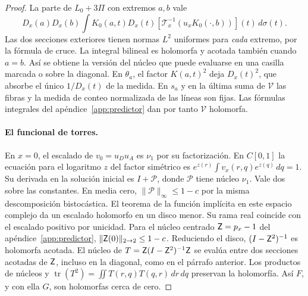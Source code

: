 \begin{proof}
La parte de \(L_0+3\Pi\) con extremos \(a,b\) vale
\[
 D_x(a)D_x(b)\int K_0(a,t)D_x(t)
     [\mathcal T_x^{-1}(u_x K_0(\cdot,b))](t)\,d\sigma(t).
\]
Las dos secciones exteriores tienen normas \(L^2\) uniformes para \emph{cada} extremo,
por la fórmula de cruce. La integral bilineal es holomorfa y acotada también cuando \(a=b\).
Así se obtiene la versión del núcleo que puede evaluarse en una casilla marcada o sobre la
diagonal. En \(\theta_a\), el factor \(K(a,t)^2\) deja \(D_x(t)^2\), que absorbe el único
\(1/D_x(t)\) de la medida. En \(s_a\) y en la última suma de \(\mathcal V\) las fibras y la
medida de conteo normalizada de las líneas son fijas. Las fórmulas integrales del
apéndice~\ref{app:predictor} dan por tanto \(\mathcal V\) holomorfa.

\paragraph{El funcional de torres.}
En \(x=0\), el escalado de \(v_0=u_Du_A\) es \(\nu_1\) por su factorización.
En \(C[0,1]\) la ecuación para el logaritmo \(z\) del factor simétrico es
\(e^{z(r)}\int v_x(r,q)e^{z(q)}\,dq=1\). Su derivada en la solución inicial es
\(I+\mathcal P\), donde \(\mathcal P\) tiene núcleo \(\nu_1\). Vale dos sobre las constantes.
En media cero, \(\|\mathcal P\|_\infty\le1-c\) por la misma descomposición bistocástica.
El teorema de la función implícita en este espacio complejo da un escalado holomorfo
en un disco menor. Su rama real coincide con el escalado positivo por unicidad.
Para el núcleo centrado \(\mathsf Z=p_x-1\) del apéndice~\ref{app:predictor},
\(\|\mathsf Z(0)\|_{2\to2}\le1-c\). Reduciendo el disco, \((I-\mathsf Z^2)^{-1}\) es holomorfa acotada.
El núcleo de \(T=\mathsf Z(I-\mathsf Z^2)^{-1}\mathsf Z\) se evalúa entre dos secciones acotadas de
 \(\mathsf Z\),
incluso en la diagonal, como en el párrafo anterior. Los productos de núcleos y
\(\operatorname{tr}(T^2)=\iint T(r,q)T(q,r)\,dr\,dq\) preservan la holomorfía.
Así \(F\), y con ella \(G\), son holomorfas cerca de cero.


\end{proof}
